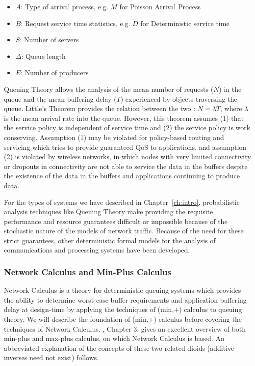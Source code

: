 \begin{itemize}
\item $A$: Type of arrival process, e.g. $M$ for Poisson Arrival Process
\item $B$: Request service time statistics, e.g. $D$ for Deterministic service time
\item $S$: Number of servers
\item $\Delta$: Queue length
\item $E$: Number of producers
\end{itemize}

Queuing Theory allows the analysis of the mean number of requests
($N$) in the queue and the mean buffering delay ($T$) experienced by
objects traversing the queue.  Little's Theorem provides the relation
between the two : $N=\lambda T$\cite{littleTheorem}, where $\lambda$
is the mean arrival rate into the queue.  However, this theorem
assumes (1) that the service policy is independent of service time and
(2) the service policy is work conserving.  Assumption (1) may be
violated for policy-based routing and servicing which tries to provide
guaranteed QoS to applications, and assumption (2) is violated by
wireless networks, in which nodes with very limited connectivity or
dropouts in connectivity are not able to service the data in the
buffers despite the existence of the data in the buffers and
applications continuing to produce data.

For the types of systems we have described in Chapter~\ref{ch:intro},
probabilistic analysis techniques like Queuing Theory make providing
the requisite performance and resource guarantees difficult or
impossible because of the stochastic nature of the models of network
traffic\cite{NC_Cruz1991}.  Because of the need for these strict
guarantees, other deterministic formal models for the analysis of
communications and processing systems have been developed.

\subsubsection{Network Calculus and Min-Plus Calculus}
Network Calculus\cite{NC_Cruz1991}\cite{NC_Cruz1991a}\cite{NCBook} is
a theory for deterministic queuing systems which provides the ability
to determine worst-case buffer requirements and application buffering
delay at design-time by applying the techniques of (min,+) calculus to
queuing theory.  We will describe the foundation of (min,+) calculus
before covering the techniques of Network Calculus. \cite{NCBook},
Chapter 3, gives an excellent overview of both min-plus and max-plus
calculus, on which Network Calculus is based.  An abbreviated
explanation of the concepts of these two related dioids (additive
inverses need not exist) follows.

